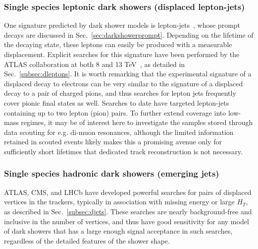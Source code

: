 \subsubsection{Single species leptonic dark showers (displaced lepton-jets)}
\label{sec:leptonjetsoffline}
One signature predicted by dark shower models is lepton-jets~\cite{Falkowski:2010cm,Falkowski:2010gv}, whose prompt decays are discussed in Sec.~\ref{sec:darkshowerprompt}. Depending on the lifetime of the decaying state, these leptons can easily be produced with a measurable displacement. Explicit searches for this signature  have been performed by the ATLAS collaboration at both 8 and 13 TeV~\cite{Aad:2014yea, ATLAS:2016jza}, as detailed in Sec.~\ref{subsec:dleptons}. It is worth remarking that the experimental signature of a displaced decay to electrons can be very similar to the signature of a displaced decay to a pair of charged pions, and thus searches for lepton jets frequently cover pionic final states as well.  Searches to date have targeted lepton-jets containing up to two lepton (pion) pairs.
To further extend coverage into low-mass regimes, it may be of interest here to investigate the samples stored through data scouting for e.g. di-muon resonances, although the limited information retained in scouted events likely makes this a promising avenue only for sufficiently short lifetimes that dedicated track reconstruction is not necessary.


\subsubsection{Single species hadronic dark showers (emerging jets)}
\label{sec:darkshoweremergingjets}


ATLAS, CMS, and LHCb have developed powerful searches for pairs of displaced vertices in the trackers, typically in association with missing energy or large $H_T$, as described in Sec.~\ref{subsec:djets}. These searches are nearly background-free and inclusive in the number of vertices, and thus have good sensitivity for any model of dark showers that has a large enough signal acceptance in such searches, regardless of the detailed features of the shower shape. 

